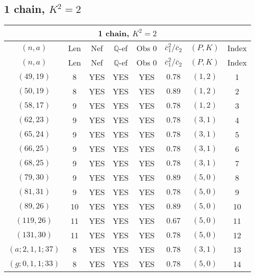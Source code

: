 \subsection{1 chain, $K^2 = 2$}
\begin{longtable}{|c|c|c|c|c|c|c|c|}
\hline
\multicolumn{8}{|c|}{1 chain, $K^2 = 2$}\\
\hline
$(n,a)$ & Len & Nef & $\mathbb Q$-ef & Obs 0 & $\overline c_1^2 / \overline c_2$ & $(P,K)$ & Index\\
\hline
\endfirsthead

\hline
$(n,a)$ & Len & Nef & $\mathbb Q$-ef & Obs 0 & $\overline c_1^2 / \overline c_2$ & $(P,K)$ & Index\\
\hline
\endhead
\hline
\endfoot

$(49,19)$ & 8 & YES & YES & YES & $0.78$ & $(1,2)$ & 1\\
$(50,19)$ & 8 & YES & YES & YES & $0.89$ & $(1,2)$ & 2\\
$(58,17)$ & 9 & YES & YES & YES & $0.78$ & $(1,2)$ & 3\\
$(62,23)$ & 9 & YES & YES & YES & $0.78$ & $(3,1)$ & 4\\
$(65,24)$ & 9 & YES & YES & YES & $0.78$ & $(3,1)$ & 5\\
$(66,25)$ & 9 & YES & YES & YES & $0.78$ & $(3,1)$ & 6\\
$(68,25)$ & 9 & YES & YES & YES & $0.78$ & $(3,1)$ & 7\\
$(79,30)$ & 9 & YES & YES & YES & $0.89$ & $(5,0)$ & 8\\
$(81,31)$ & 9 & YES & YES & YES & $0.78$ & $(5,0)$ & 9\\
$(89,26)$ & 10 & YES & YES & YES & $0.89$ & $(5,0)$ & 10\\
$(119,26)$ & 11 & YES & YES & YES & $0.67$ & $(5,0)$ & 11\\
$(131,30)$ & 11 & YES & YES & YES & $0.78$ & $(5,0)$ & 12\\
$(a;2,1,1;37)$ & 8 & YES & YES & YES & $0.78$ & $(3,1)$ & 13\\
$(g;0,1,1;33)$ & 8 & YES & YES & YES & $0.78$ & $(5,0)$ & 14
\end{longtable}
